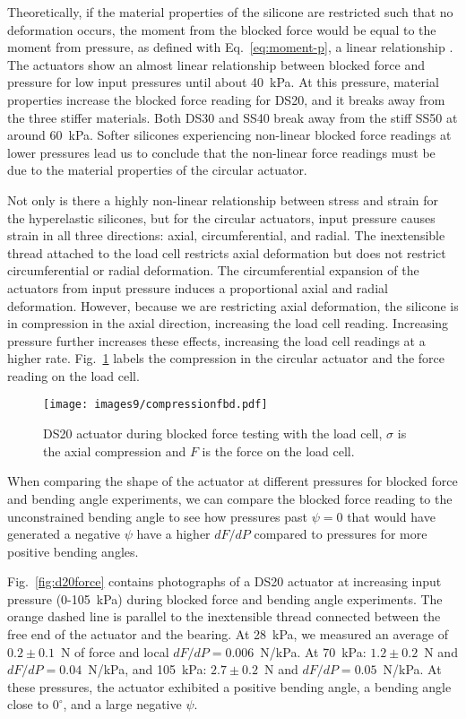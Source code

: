 Theoretically, if the material properties of the silicone are restricted such that no deformation occurs, the moment from the blocked force would be equal to the moment from pressure, as defined with Eq.~\ref{eq:moment-p}, a linear relationship \cite{polygerinos_modeling_2015}. The actuators show an almost linear relationship between blocked force and pressure for low input pressures until about 40~kPa. At this pressure, material properties increase the blocked force reading for DS20, and it breaks away from the three stiffer materials. Both DS30 and SS40 break away from the stiff SS50 at around 60~kPa. Softer silicones experiencing non-linear blocked force readings at lower pressures lead us to conclude that the non-linear force readings must be due to the material properties of the circular actuator.

Not only is there a highly non-linear relationship between stress and strain for the hyperelastic silicones, but for the circular actuators, input pressure causes strain in all three directions: axial, circumferential, and radial. The inextensible thread attached to the load cell restricts axial deformation but does not restrict circumferential or radial deformation. The circumferential expansion of the actuators from input pressure induces a proportional axial and radial deformation. However, because we are restricting axial deformation, the silicone is in compression in the axial direction, increasing the load cell reading. Increasing pressure further increases these effects, increasing the load cell readings at a higher rate. Fig.~\ref{fig:compressionfbd} labels the compression in the circular actuator and the force reading on the load cell. 

\begin{figure}[!ht]
    \centering
     \texttt{[image: images9/compressionfbd.pdf]}
    \caption{DS20 actuator during blocked force testing with the load cell, $\sigma$ is the axial compression and $F$ is the force on the load cell.}
    \label{fig:compressionfbd}
\end{figure}

When comparing the shape of the actuator at different pressures for blocked force and bending angle experiments, we can compare the blocked force reading to the unconstrained bending angle to see how pressures past $\psi=0$ that would have generated a negative $\psi$ have a higher $dF/dP$ compared to pressures for more positive bending angles.  

Fig.~\ref{fig:d20force} contains photographs of a DS20 actuator at increasing input pressure (0-105~kPa) during blocked force and bending angle experiments. The orange dashed line is parallel to the inextensible thread connected between the free end of the actuator and the bearing. At 28~kPa, we measured an average of $0.2\pm0.1$~N of force and local $dF/dP=0.006$~N/kPa. At 70~kPa: $1.2\pm0.2$~N and $dF/dP=0.04$~N/kPa, and 105~kPa: $2.7\pm0.2$~N and $dF/dP=0.05$~N/kPa. At these pressures, the actuator exhibited a positive bending angle, a bending angle close to $0^\circ$, and a large negative $\psi$. 


